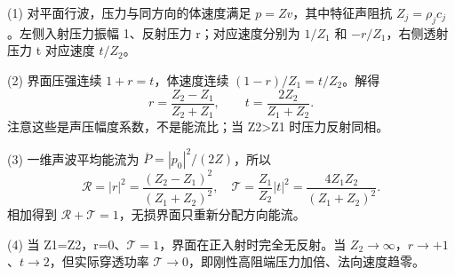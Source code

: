 (1) 对平面行波，压力与同方向的体速度满足 \(p=Zv\)，其中特征声阻抗 \(Z_j=\rho_jc_j\)。左侧入射压力振幅 1、反射压力 r；对应速度分别为 \(1/Z_1\) 和 \(-r/Z_1\)，右侧透射压力 t 对应速度 \(t/Z_2\)。

(2) 界面压强连续 \(1+r=t\)，体速度连续 \((1-r)/Z_1=t/Z_2\)。解得
\[
r=\frac{Z_2-Z_1}{Z_2+Z_1},\qquad
t=\frac{2Z_2}{Z_1+Z_2}.
\]
注意这些是声压幅度系数，不是能流比；当 Z2>Z1 时压力反射同相。

(3) 一维声波平均能流为 \(\overline P=|p_0|^2/(2Z)\)，所以
\[
\mathcal R=|r|^2=\frac{(Z_2-Z_1)^2}{(Z_1+Z_2)^2},
\quad
\mathcal T=\frac{Z_1}{Z_2}|t|^2=\frac{4Z_1Z_2}{(Z_1+Z_2)^2}.
\]
相加得到 \(\mathcal R+\mathcal T=1\)，无损界面只重新分配方向能流。

(4) 当 Z1=Z2，r=0、\(\mathcal T=1\)，界面在正入射时完全无反射。当 \(Z_2\to\infty\)，\(r\to +1\)、\(t\to 2\)，但实际穿透功率 \(\mathcal T\to0\)，即刚性高阻端压力加倍、法向速度趋零。
